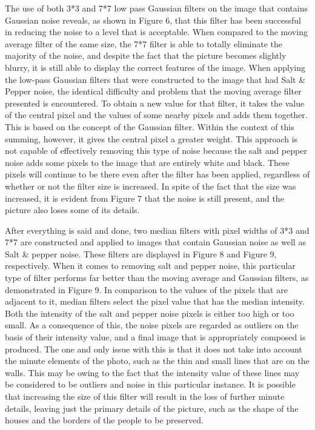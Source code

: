 The use of both 3*3 and 7*7 low pass Gaussian filters on the image that contains Gaussian noise reveals, as shown in Figure 6, that this filter has been successful in reducing the noise to a level that is acceptable. When compared to the moving average filter of the same size, the 7*7 filter is able to totally eliminate the majority of the noise, and despite the fact that the picture becomes slightly blurry, it is still able to display the correct features of the image.
When applying the low-pass Gaussian filters that were constructed to the image that had Salt \& Pepper noise, the identical difficulty and problem that the moving average filter presented is encountered. To obtain a new value for that filter, it takes the value of the central pixel and the values of some nearby pixels and adds them together. This is based on the concept of the Gaussian filter. Within the context of this summing, however, it gives the central pixel a greater weight. This approach is not capable of effectively removing this type of noise because the salt and pepper noise adds some pixels to the image that are entirely white and black. These pixels will continue to be there even after the filter has been applied, regardless of whether or not the filter size is increased. In spite of the fact that the size was increased, it is evident from Figure 7 that the noise is still present, and the picture also loses some of its details. 

After everything is said and done, two median filters with pixel widths of 3*3 and 7*7 are constructed and applied to images that contain Gaussian noise as well as Salt \& pepper noise. These filters are displayed in Figure 8 and Figure 9, respectively. When it comes to removing salt and pepper noise, this particular type of filter performs far better than the moving average and Gaussian filters, as demonstrated in Figure 9. In comparison to the values of the pixels that are adjacent to it, median filters select the pixel value that has the median intensity. Both the intensity of the salt and pepper noise pixels is either too high or too small. As a consequence of this, the noise pixels are regarded as outliers on the basis of their intensity value, and a final image that is appropriately composed is produced. The one and only issue with this is that it does not take into account the minute elements of the photo, such as the thin and small lines that are on the walls. This may be owing to the fact that the intensity value of these lines may be considered to be outliers and noise in this particular instance. It is possible that increasing the size of this filter will result in the loss of further minute details, leaving just the primary details of the picture, such as the shape of the houses and the borders of the people to be preserved.  

